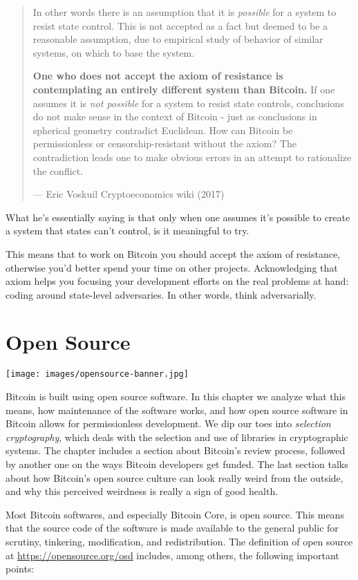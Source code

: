 \begin{quote}
In other words there is an assumption that it is \emph{possible} for a
system to resist state control. This is not accepted as a fact but
deemed to be a reasonable assumption, due to empirical study of behavior
of similar systems, on which to base the system.

\textbf{One who does not accept the axiom of resistance is contemplating
an entirely different system than Bitcoin.} If one assumes it is
\emph{not possible} for a system to resist state controls, conclusions
do not make sense in the context of Bitcoin - just as conclusions in
spherical geometry contradict Euclidean. How can Bitcoin be
permissionless or censorship-resistant without the axiom? The
contradiction leads one to make obvious errors in an attempt to
rationalize the conflict.

---  Eric Voskuil Cryptoeconomics wiki (2017)
\end{quote}

What he's essentially saying is that only when one assumes it's possible
to create a system that states can't control, is it meaningful to try.

This means that to work on Bitcoin you should accept the axiom of
resistance, otherwise you'd better spend your time on other projects.
Acknowledging that axiom helps you focusing your development efforts on
the real problems at hand: coding around state-level adversaries. In
other words, think adversarially.

\hypertarget{opensource}{%
\section{Open Source}\label{opensource}}

\texttt{[image: images/opensource-banner.jpg]}

Bitcoin is built using open source software. In this chapter we analyze
what this means, how maintenance of the software works, and how open
source software in Bitcoin allows for permissionless development. We dip
our toes into \emph{selection cryptography}, which deals with the
selection and use of libraries in cryptographic systems. The chapter
includes a section about Bitcoin's review process, followed by another
one on the ways Bitcoin developers get funded. The last section talks
about how Bitcoin's open source culture can look really weird from the
outside, and why this perceived weirdness is really a sign of good
health.

Most Bitcoin softwares, and especially Bitcoin Core, is open source.
This means that the source code of the software is made available to the
general public for scrutiny, tinkering, modification, and
redistribution. The definition of open source at
\url{https://opensource.org/osd} includes, among others, the following
important points:

